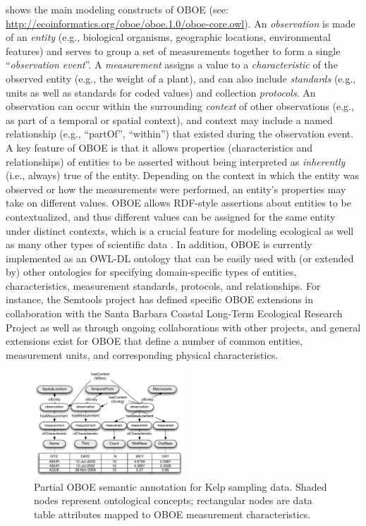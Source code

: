  shows the main modeling constructs of OBOE (see:
\url{http://ecoinformatics.org/oboe/oboe.1.0/oboe-core.owl}). An {\em
  observation} is made of an {\em entity} (e.g., biological organisms,
geographic locations, environmental features) and serves to group a
set of measurements together to form a single ``\emph{observation
  event}''. A \emph{measurement} assigns a value to a {\em
  characteristic} of the observed entity (e.g., the weight of a
plant), and can also include \emph{standards} (e.g., units as well as
standards for coded values) and collection \emph{protocols}. An
observation can occur within the surrounding \emph{context} of other
observations (e.g., as part of a temporal or spatial context), and
context may include a named relationship (e.g., ``partOf'',
``within'') that existed during the observation event. A key feature
of OBOE is that it allows properties (characteristics and
relationships) of entities to be asserted without being interpreted as
\emph{inherently} (i.e., {always}) true of the entity.  Depending on
the context in which the entity was observed or how the measurements
were performed, an entity's properties may take on different values.
OBOE allows RDF-style assertions about entities to be contextualized,
and thus different values can be assigned for the same entity under
distinct contexts, which is a crucial feature for modeling ecological
as well as many other types of scientific data
\cite{bowers08,mungall07:_repres_phenot_in_owl}. In addition, OBOE is
currently implemented as an OWL-DL ontology that can be easily used
with (or extended by) other ontologies for specifying domain-specific
types of entities, characteristics, measurement standards, protocols,
and relationships. For instance, the Semtools project has defined
specific OBOE extensions in collaboration with the Santa Barbara
Coastal Long-Term Ecological Research Project as well as through
ongoing collaborations with other projects, and general extensions
exist for OBOE that define a number of common entities, measurement
units, and corresponding physical characteristics.

\begin{figure}[!b]
\centering
\includegraphics[width=0.5\textwidth]{images/kelp-mass-model.pdf}
\caption{Partial OBOE semantic annotation for Kelp sampling
  data. Shaded nodes represent ontological concepts; rectangular nodes
  are data table attributes mapped to OBOE measurement
  characteristics.}
\label{fig:kelp-mass-model}
\end{figure}

